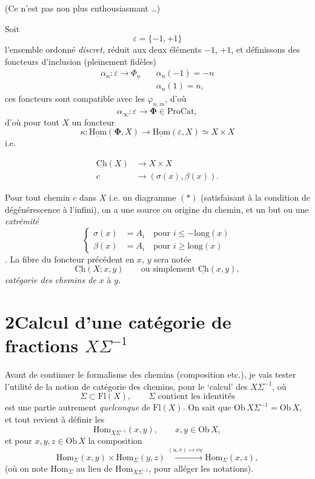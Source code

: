 \documentclass[11pt]{article}
\newcommand{\printedpage}[1]{\marginpar{\footnotesize p.~#1}}
\newcommand{\msp}[1]{\marginpar{\footnotesize [#1]}}
\newcommand{\uCh}{\underline{\mathrm{Ch}}}
\newcommand{\uHom}{\underline{\mathrm{Hom}}}
\newcommand{\Hom}{\mathrm{Hom}}
\begin{document}
\printedpage{4}

(Ce n'est pas non plus enthousiasmant \dots)

Soit
\[
\varepsilon=\{-1,+1\}
\]
l'ensemble ordonné \textit{discret,} réduit aux deux éléments $-1$, $+1$, et définissons des foncteurs d'inclusion (pleinement fidèles)
\[
\begin{aligned}
\alpha_n:\varepsilon\longrightarrow\Phi_n\quad & \alpha_n(-1)=-n\\
& \alpha_n(1)=n,
\end{aligned}
\]
ces foncteurs sont compatible avec les $\varphi_{n,m}$, d'où %
\[
\alpha_\infty:\varepsilon\longrightarrow\boldsymbol{\Phi}\in\mathrm{ProCat},
\]
d'où pour tout $X$ un foncteur
\[
\kappa:\uHom(\boldsymbol{\Phi},X)\longrightarrow\uHom(\varepsilon,X)\simeq X\times X
\]
i.e.

\msp{page 5}
\[
\begin{aligned}
\uCh(X) &\longrightarrow X\times X\\
c &\longrightarrow (\sigma(x),\beta(x)).
\end{aligned}
\]

 Pour tout chemin $c$ dans $X$ i.e. un diagramme $(*)$ (satisfaisant à la condition de dégénérescence à l'infini), on a une source ou origine du chemin, et un but ou une \textit{extrémité}
\[
\left\{
\begin{aligned}
\sigma(x) &= A_i\quad\text{pour } i\leq -\mathrm{long}(x)\\
\beta(x) &= A_i\quad\text{pour } i\geq \mathrm{long}(x)
\end{aligned}
\right.
\]
. La fibre du foncteur précédent en $x$, $y$ sera notée
\[
\uCh(X;x,y)\qquad\text{ou simplement }\uCh(x,y),
\]
\textit{catégorie des chemins de $x$} à \textit{$y$.}

\printedpage{5}

\section*{2\quad Calcul d'une catégorie de fractions $X\Sigma^{-1}$}

Avant de continuer le formalisme des chemins (composition etc.), je vais tester l'utilité de la notion de catégorie des chemins, pour le `calcul' des $X\Sigma^{-1}$, où
\[
\Sigma\subset\mathrm{Fl}(X),\qquad\Sigma\text{ contient les identités}
\]
est une partie autrement \textit{quelconque} de $\mathrm{Fl}(X)$. On sait que $\mathrm{Ob}\,X\Sigma^{-1}=\mathrm{Ob}\,X$, et tout revient à définir les
\[
\Hom_{X\Sigma^{-1}}(x,y),\qquad x,y\in\mathrm{Ob}\,X,
\]
\msp{page 6}
et pour $x,y,z\in\mathrm{Ob}\,X$ la composition
\[
\Hom_\Sigma(x,y)\times\Hom_\Sigma(y,z)\xrightarrow{(u,v)\mapsto vu}\Hom_\Sigma(x,z),
\]
(où on note $\Hom_\Sigma$ au lieu de $\Hom_{X\Sigma^{-1}}$, pour alléger les notations).
\end{document}
